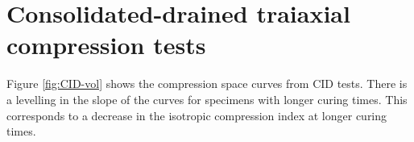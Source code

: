 \documentclass{nuropc}
\begin{document}
\section{Consolidated-drained traiaxial compression tests}
Figure \ref{fig:CID-vol} shows the compression space curves 
from CID tests. 
There is a levelling in the slope of the curves 
for specimens with longer curing times.
This corresponds to a decrease in the 
isotropic compression index at longer curing times.



\end{document}
